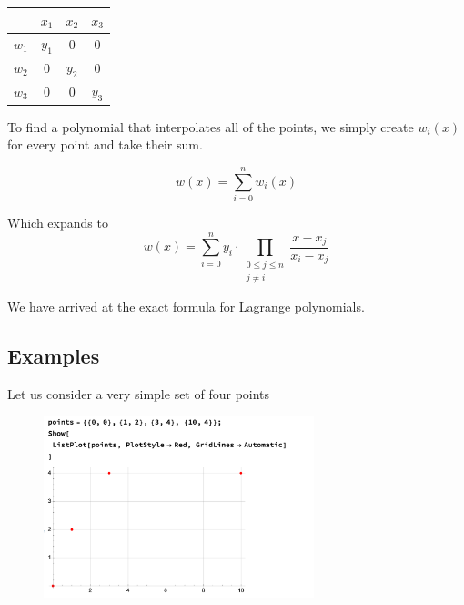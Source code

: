 \documentclass{MathematicaReport}
\begin{document}
\begin{table}[h!]
    \centering
    \begin{tabular}{c|ccc}
			      & \( x_1 \) & \( x_2 \) & \( x_3 \)\\ \hline
        \( w_1 \) & \( y_1 \) & \(  0  \) & \(  0  \)\\ 
        \( w_2 \) & \(  0  \) & \( y_2 \) & \(  0  \)\\ 
        \( w_3 \) & \(  0  \) & \(  0  \) & \( y_3 \)\\ 
    \end{tabular}
\end{table}

To find a polynomial that interpolates all of the points, we simply create
\( w_i(x) \) for every point and take their sum.

\[
	w(x) = \sum_{i = 0}^n w_i(x)
\]

Which expands to	
\[
	w(x) = \sum_{i=0}^n y_i \cdot \prod_{\begin{smallmatrix}0\le j\le n\\ j\neq i\end{smallmatrix}}
	 \frac{x-x_j}{x_i-x_j}
\]

We have arrived at the exact formula for Lagrange polynomials.


\subsection{Examples}
Let us consider a very simple set of four points
\begin{figure}[H]
\centering
\includegraphics[width=0.7\textwidth]{images/lagrange_example1.png}
\end{figure}
\end{document}
